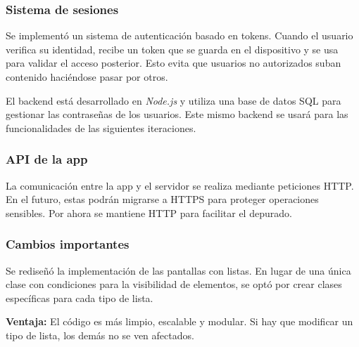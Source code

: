\subsubsection{Sistema de sesiones}
Se implement\'o un sistema de autenticaci\'on basado en tokens. Cuando el usuario verifica su identidad, recibe un token que se guarda en el dispositivo y se usa para validar el acceso posterior. Esto evita que usuarios no autorizados suban contenido haci\'endose pasar por otros.

El backend est\'a desarrollado en \textit{Node.js} y utiliza una base de datos SQL para gestionar las contrase\~nas de los usuarios. Este mismo backend se usar\'a para las funcionalidades de las siguientes iteraciones.

\subsubsection{API de la app}
La comunicaci\'on entre la app y el servidor se realiza mediante peticiones HTTP. En el futuro, estas podr\'an migrarse a HTTPS para proteger operaciones sensibles. Por ahora se mantiene HTTP para facilitar el depurado.

\subsubsection{Cambios importantes}
Se redise\~n\'o la implementaci\'on de las pantallas con listas. En lugar de una \'unica clase con condiciones para la visibilidad de elementos, se opt\'o por crear clases espec\'ificas para cada tipo de lista.

\textbf{Ventaja:} El c\'odigo es m\'as limpio, escalable y modular. Si hay que modificar un tipo de lista, los dem\'as no se ven afectados.

